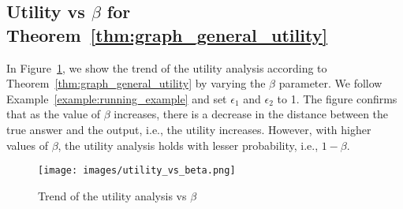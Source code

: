 \subsection{Utility vs $\beta$ for Theorem~\ref{thm:graph_general_utility}}
In Figure~\ref{fig:utility_vs_beta}, we show the trend of the utility analysis according to Theorem~\ref{thm:graph_general_utility} by varying the $\beta$ parameter. We follow Example~\ref{example:running_example} and set $\epsilon_1$ and $\epsilon_2$ to 1. The figure confirms that as the value of $\beta$ increases, there is a decrease in the distance between the true answer and the output, i.e., the utility increases. However, with higher values of $\beta$, the utility analysis holds with lesser probability, i.e., $1-\beta$. 

\begin{figure}
    \centering
    \texttt{[image: images/utility\_vs\_beta.png]}
    \caption{Trend of the utility analysis vs $\beta$}
    \label{fig:utility_vs_beta}
\end{figure}